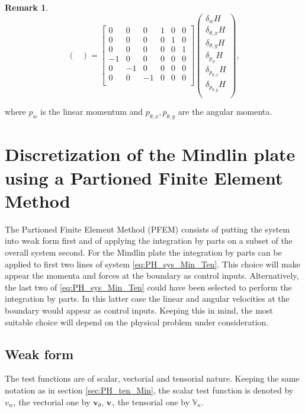 \documentclass[preprint,12pt]{elsarticle}
\newtheorem{remark}{Remark}
\begin{document}
{\begin{remark}
\begin{equation}
\begin{pmatrix}
	\end{pmatrix} = 
	\begin{bmatrix}
	0&0&0&1&0&0 \\
	0&0&0&0&1&0 \\
	0&0&0&0&0&1 \\
	-1&0&0&0&0&0\\
	0&-1&0&0&0&0\\
	0&0&-1&0&0&0\\
	\end{bmatrix}
	\begin{pmatrix}
	\delta_w H\\ \delta_{\theta, x} H\\ \delta_{\theta, y} H\\ \delta_{p_w} H\\\delta_{p_{\theta, x}} H\\\delta_{p_{\theta, y}} H\\
	\end{pmatrix},
	\end{equation}
\end{remark}
where $p_w$ is the linear momentum and $p_{\theta, x}, p_{\theta, y}$ are the angular momenta.
}


\section{Discretization of the Mindlin plate using a Partioned Finite Element Method}
The Partioned Finite Element Method (PFEM) \cite{CardosoRibeiro2018} consists of putting the system into weak form first and of applying the integration by parts on a subset of the overall system second. For the Mindlin plate the integration by parts can be applied to first two lines of system \eqref{eq:PH_sys_Min_Ten}. This choice will make appear the momenta and forces at the boundary as control inputs. Alternatively, the last two of \eqref{eq:PH_sys_Min_Ten} could have been selected to perform the integration by parts. In this latter case the linear and angular velocities at the boundary would appear as control inputs. Keeping this in mind, the most suitable choice will depend on the physical problem under consideration.

\subsection{Weak form}
The test functions are of scalar, vectorial and tensorial nature. Keeping the same notation as in section \ref{sec:PH_ten_Min}, the scalar test function is denoted by $v_w$, the vectorial one by $\bm{v}_{\theta}$, $\bm{v}_{\gamma}$  the tensorial one by $\mathbb{V}_{\kappa}$.
\end{document}
